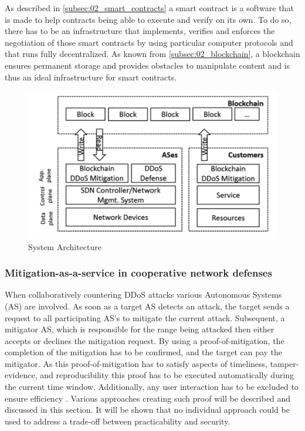 As described in \ref{subsec:02_smart_contracts} a smart contract is a software that is made to help contracts being able to execute and verify on its own. To do so, there has to be an infrastructure that implements, verifies and enforces the negotiation of those smart contracts by using particular computer protocols and that runs fully decentralized. As known from \ref{subsec:02_blockchain}, a blockchain ensures permanent storage and provides obstacles to manipulate content and is thus an ideal infrastructure for smart contracts.

\begin{figure}[ht]
  \begin{center}
  \includegraphics[scale=0.6]{Talk7/img/ddos/collaborative_ddos_mitigation_system_architecture}
  \end{center}
  \caption{System Architecture}
  \label{system_architecture}
\end{figure}



\subsubsection{Mitigation-as-a-service in cooperative network defenses}
When collaboratively countering DDoS attacks various Autonomous Systems (AS) are involved. As soon as a target AS detects an attack, the target sends a request to all participating AS's to mitigate the current attack. Subsequent, a mitigator AS, which is responsible for the range being attacked then either accepts or declines the mitigation request. By using a proof-of-mitigation, the completion of the mitigation has to be confirmed, and the target can pay the mitigator. As this proof-of-mitigation has to satisfy aspects of timeliness, tamper-evidence, and reproducibility this proof has to be executed automatically during the current time window. Additionally, any user interaction has to be excluded to ensure efficiency \cite{Mannhart2018}. Various approaches creating such proof will be described and discussed in this section. It will be shown that no individual approach could be used to address a trade-off between practicability and security.

